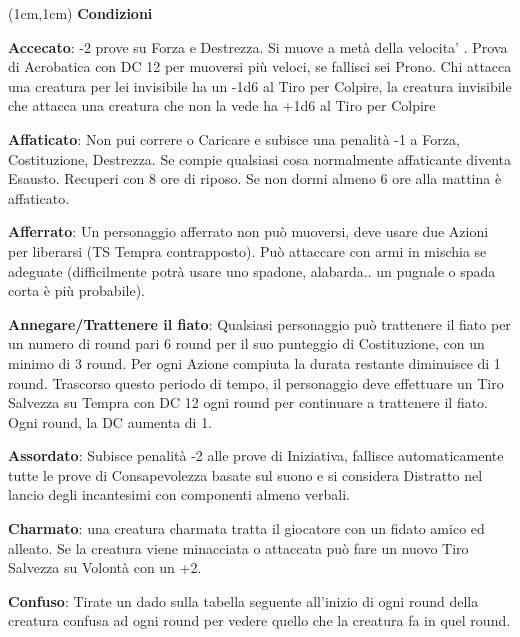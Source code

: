\documentclass[a4paper,12 pt,openany]{book}
\begin{document}
	\center

	\begin{textblock*}{19 cm}(1cm,1cm) %
		\flushleft
		\textbf{Condizioni}\\
		\footnotesize

		\begin{multicols}{2}

\textbf{Accecato}: -2 prove su Forza e Destrezza.
Si muove a metà della velocita' . Prova di Acrobatica con DC 12 per muoversi più veloci, se fallisci sei Prono.
Chi attacca una creatura per lei invisibile ha un -1d6 al Tiro per Colpire, la creatura invisibile che attacca una creatura che non la vede ha +1d6 al Tiro per Colpire

\textbf{Affaticato}: Non pui correre o Caricare e subisce una penalità -1 a Forza, Costituzione, Destrezza. Se compie qualsiasi cosa normalmente affaticante diventa Esausto.
Recuperi con 8 ore di riposo. Se non dormi almeno 6 ore alla mattina è affaticato.

\textbf{Afferrato}: Un personaggio afferrato non può muoversi, deve usare due Azioni per liberarsi (TS Tempra contrapposto). Può attaccare con armi in mischia se adeguate (difficilmente potrà usare uno spadone, alabarda.. un pugnale o spada corta è più probabile).

\textbf{Annegare/Trattenere il fiato}:  Qualsiasi personaggio può trattenere il fiato per un numero di round pari 6 round per il suo punteggio di Costituzione, con un minimo di 3 round. Per ogni Azione compiuta la durata restante diminuisce di 1 round. Trascorso questo periodo di tempo, il personaggio deve effettuare un Tiro Salvezza su Tempra con DC 12 ogni round per continuare a trattenere il fiato. Ogni round, la DC aumenta di 1.

\textbf{Assordato}: Subisce penalità -2 alle prove di Iniziativa, fallisce automaticamente tutte le prove di Consapevolezza basate sul suono e si considera Distratto nel lancio degli incantesimi con componenti almeno verbali.

\textbf{Charmato}: una creatura charmata tratta il giocatore con un fidato amico ed alleato. Se la creatura viene minacciata o attaccata può fare un nuovo Tiro Salvezza su Volontà con un +2.

\textbf{Confuso}:  Tirate un dado sulla tabella seguente all'inizio di ogni round della creatura confusa ad ogni round per vedere quello che la creatura fa in quel round.


\end{multicols}
\end{textblock*}
\end{document}

